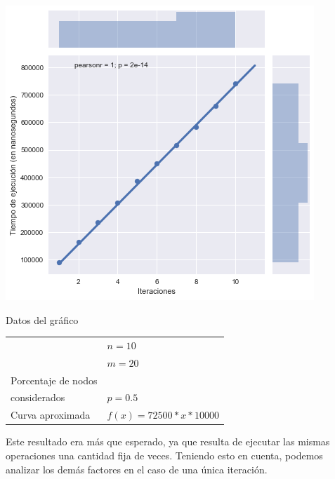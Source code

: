 \noindent
\begin{minipage}{0.55\textwidth}
    \hfill
    \includegraphics[scale=0.6]{img/grasp-it.png}
\end{minipage}
\hfill
\begin{minipage}{0.44\textwidth}
    \begin{center}
        Datos del gráfico

        \begin{tabular}{ | l l |}
            \hline
             & $n = 10$ \\ 
             & $m = 20$ \\ 
            Porcentaje de nodos & \\
            considerados & $p = 0.5$ \\ 
            Curva aproximada & $f(x) = 72500 * x * 10000$ \\
            \hline
        \end{tabular}
    \end{center}
\end{minipage}

Este resultado era más que esperado, ya que resulta de ejecutar las mismas operaciones una cantidad fija de veces. Teniendo esto en cuenta, podemos analizar los demás factores en el caso de una única iteración.

